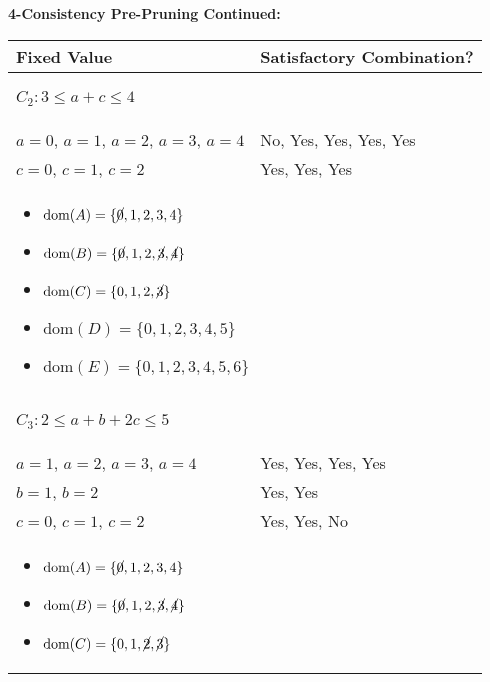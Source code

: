 \begin{example} \textbf{4-Consistency Pre-Pruning Continued:}
    \begin{center}
        \begin{tabular}{ll}
            \textbf{Fixed Value} & \textbf{Satisfactory Combination?} \\
            \toprule
            \multicolumn{2}{p{\linewidth}}{
            \begin{center}
                $C_2: 3 \leq a + c \leq 4$
            \end{center}} \\
            \midrule
                $a=0$, $a=1$, $a=2$, $a=3$, $a=4$ & No, Yes, Yes, Yes, Yes \\
                $c=0$, $c=1$, $c=2$ & Yes, Yes, Yes \\
            \multicolumn{2}{p{\linewidth}}{
            \begin{itemize}
                \item $\text{dom}(A) = \{\cancel{0}, 1, 2, 3, 4\}$
                \item $\text{dom}(B) = \{\cancel{0}, 1, 2, \cancel{3}, \cancel{4}\} $
                \item $\text{dom}(C) = \{0, 1, 2, \cancel{3}\} $
                \item $\text{dom}(D) = \{0, 1, 2, 3, 4, 5\} $
                \item $\text{dom}(E) = \{0, 1, 2, 3, 4, 5, 6\} $
            \end{itemize}} \\
            \midrule
            \multicolumn{2}{p{\linewidth}}{
            \begin{center}
                $C_3: 2 \leq a + b + 2c \leq 5$
            \end{center}} \\
            \midrule
                $a=1$, $a=2$, $a=3$, $a=4$ & Yes, Yes, Yes, Yes \\
                $b=1$, $b=2$ & Yes, Yes \\
                $c=0$, $c=1$, $c=2$ & Yes, Yes, No \\
            \multicolumn{2}{p{\linewidth}}{
            \begin{itemize}
                \item $\text{dom}(A) = \{\cancel{0}, 1, 2, 3, 4\}$
                \item $\text{dom}(B) = \{\cancel{0}, 1, 2, \cancel{3}, \cancel{4}\} $
                \item $\text{dom}(C) = \{0, 1, \cancel{2}, \cancel{3}\} $

\end{itemize}}
\end{tabular}
\end{center}
\end{example}
